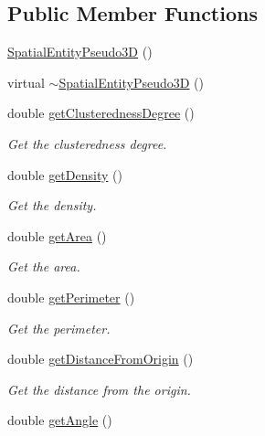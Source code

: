 \subsection*{\-Public \-Member \-Functions}
\begin{DoxyCompactItemize}
\item 
\hyperlink{classmultiscale_1_1analysis_1_1SpatialEntityPseudo3D_aa391fae1e086502392a2c89dcea27022}{\-Spatial\-Entity\-Pseudo3\-D} ()
\item 
virtual \hyperlink{classmultiscale_1_1analysis_1_1SpatialEntityPseudo3D_a5d44f1cc668d9ef8b1bb5ba573a08c93}{$\sim$\-Spatial\-Entity\-Pseudo3\-D} ()
\item 
double \hyperlink{classmultiscale_1_1analysis_1_1SpatialEntityPseudo3D_a532020267c8ffd4375e2d204debf8454}{get\-Clusteredness\-Degree} ()
\begin{DoxyCompactList}\small\item\em \-Get the clusteredness degree. \end{DoxyCompactList}\item 
double \hyperlink{classmultiscale_1_1analysis_1_1SpatialEntityPseudo3D_a98a29584b604d113db53e7009fd3cb79}{get\-Density} ()
\begin{DoxyCompactList}\small\item\em \-Get the density. \end{DoxyCompactList}\item 
double \hyperlink{classmultiscale_1_1analysis_1_1SpatialEntityPseudo3D_ae85647e35a4cbb3ed193d039cf0395a9}{get\-Area} ()
\begin{DoxyCompactList}\small\item\em \-Get the area. \end{DoxyCompactList}\item 
double \hyperlink{classmultiscale_1_1analysis_1_1SpatialEntityPseudo3D_a455bf65abb87bd8b65d0cbe2234e4491}{get\-Perimeter} ()
\begin{DoxyCompactList}\small\item\em \-Get the perimeter. \end{DoxyCompactList}\item 
double \hyperlink{classmultiscale_1_1analysis_1_1SpatialEntityPseudo3D_a26530af3d05b0257386ce02498a5a84b}{get\-Distance\-From\-Origin} ()
\begin{DoxyCompactList}\small\item\em \-Get the distance from the origin. \end{DoxyCompactList}\item 
double \hyperlink{classmultiscale_1_1analysis_1_1SpatialEntityPseudo3D_a9f3394cfe46d66ae9c13d805ad460cb5}{get\-Angle} ()

\end{DoxyCompactItemize}
